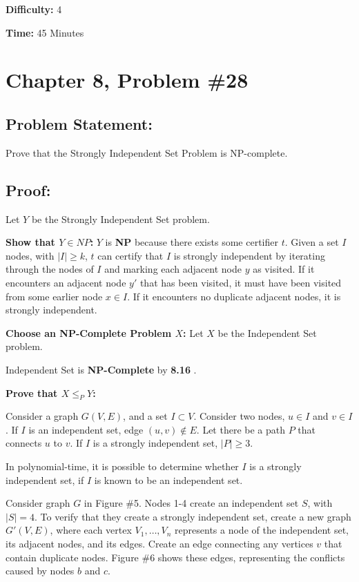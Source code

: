 \documentclass{article}
\begin{document}
\noindent \textbf{Difficulty:}  4

\noindent \textbf{Time:}  45 Minutes

\newpage

\section*{Chapter 8, Problem \#28}

\subsection*{Problem Statement:}  
Prove that the Strongly Independent Set Problem is NP-complete.

\subsection*{Proof:}
Let $Y$ be the Strongly Independent Set problem.

\noindent \textbf{Show that $Y \in NP$:} \newline
$Y$ is \textbf{NP} because there exists some certifier $t$.  
Given a set $I$ nodes, with $|I| \geq k$, $t$ can certify that $I$ is strongly independent by iterating through the nodes of $I$ and marking each adjacent node $y$ as visited.  If it encounters an adjacent node $y'$ that has been visited, it must have been visited from some earlier node $x \in I$.  If it encounters no duplicate adjacent nodes, it is strongly independent.

\noindent \textbf{Choose an NP-Complete Problem $X$:}  Let $X$ be the Independent Set problem.

Independent Set is \textbf{NP-Complete} by \textbf{8.16} \cite{algDesign}.

\noindent \textbf{Prove that $X \leq_P Y$:}

Consider a graph $G(V, E)$, and a set $I \subset V$.
Consider two nodes, $u \in I$ and $v \in I$.  If $I$ is an independent set, edge $(u, v) \notin E$. Let there be a path $P$ that connects $u$ to $v$.  If $I$ is a strongly independent set, $|P| \geq 3$.  

In polynomial-time, it is possible to determine whether $I$ is a strongly independent set, if $I$ is known to be an independent set.

Consider graph $G$ in Figure \#5. Nodes 1-4 create an independent set $S$, with $|S|=4$.  
To verify that they create a strongly independent set, create a new graph $G'(V,E)$, where each vertex $V_1, \dots , V_n$ represents a node of the independent set, its adjacent nodes, and its edges.  
Create an edge connecting any vertices $v$ that contain duplicate nodes.  
Figure \#6 shows these edges, representing the conflicts caused by nodes $b$ and $c$.
\end{document}
